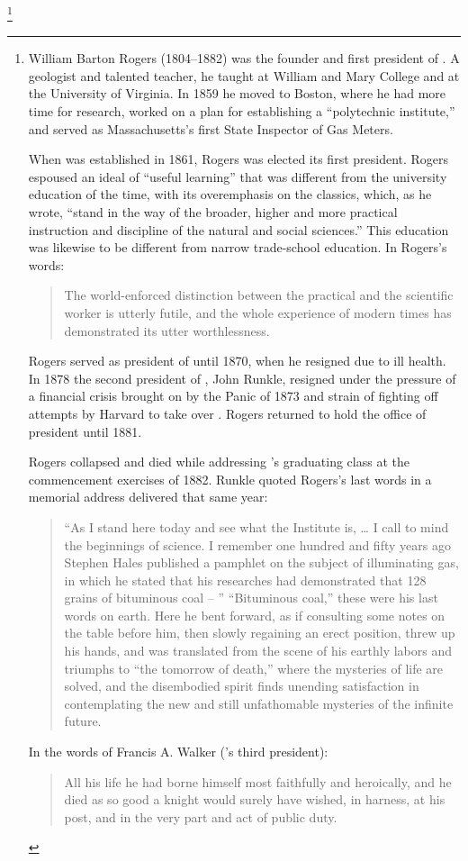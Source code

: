 \footnote{
	William Barton Rogers (1804--1882) was the founder and first president of .
	A geologist and talented teacher, he taught at William and Mary College and at the University of Virginia.
	In 1859 he moved to Boston, where he had more time for research, worked on a plan for establishing a “polytechnic institute,” and served as Massachusetts’s first State Inspector of Gas Meters.

	When  was established in 1861, Rogers was elected its first president.
	Rogers espoused an ideal of “useful learning” that was different from the university education of the time, with its overemphasis on the classics, which, as he wrote, “stand in the way of the broader, higher and more practical instruction and discipline of the natural and social sciences.”
	This education was likewise to be different from narrow trade-school education.
	In Rogers’s words:

	\begin{quote}
		The world-enforced distinction between the practical and the scientific worker
		is utterly futile, and the whole experience of modern times has demonstrated
		its utter worthlessness.
	\end{quote}

	Rogers served as president of  until 1870, when he resigned due to ill health.
	In 1878 the second president of , John Runkle, resigned under the pressure of a financial crisis brought on by the Panic of 1873 and strain of fighting off attempts by Harvard to take over .
	Rogers returned to hold the office of president until 1881.

	Rogers collapsed and died while addressing ’s graduating class at the commencement exercises of 1882.
	Runkle quoted Rogers’s last words in a memorial address delivered that same year:

	\begin{quote}
		“As I stand here today and see what the Institute is, … I call to mind the beginnings of science.
		I remember one hundred and fifty years ago Stephen Hales published a pamphlet on the subject of illuminating gas, in which he stated that his researches had demonstrated that 128 grains of bituminous coal -- ” “Bituminous coal,” these were his last words on earth.
		Here he bent forward, as if consulting some notes on the table before him, then slowly regaining an erect position, threw up his hands, and was translated from the scene of his earthly labors and triumphs to “the tomorrow of death,” where the mysteries of life are solved, and the disembodied spirit finds unending satisfaction in contemplating the new and still unfathomable mysteries of the infinite future.
	\end{quote}

	In the words of Francis A. Walker (’s third president):

	\begin{quote}
		All his life he had borne himself most faithfully and heroically, and he died  as so good a knight would surely have wished, in harness, at his post, and in the very part and act of public duty.
	\end{quote}
}
